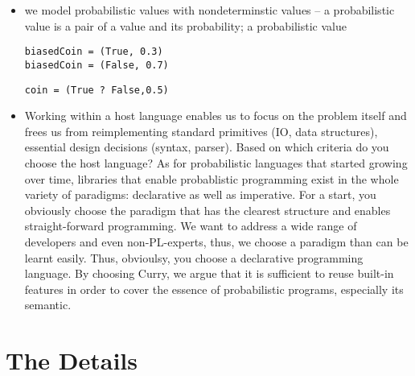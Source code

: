 \documentclass[
12pt, %
a4paper, %
oneside, %
]{llncs}
\begin{document}
\begin{itemize}
\item we model probabilistic values with nondeterminstic values -- a
  probabilistic value is a pair of a value and its probability; a
  probabilistic value %

\begin{verbatim}
biasedCoin = (True, 0.3)
biasedCoin = (False, 0.7)
\end{verbatim}

\begin{verbatim}
coin = (True ? False,0.5)
\end{verbatim}

\item Working within a host language enables us to focus on the
  problem itself and frees us from reimplementing standard primitives
  (IO, data structures), essential design decisions (syntax,
  parser). %
  Based on which criteria do you choose the host language? %
  As for probabilistic languages that started growing over time,
  libraries that enable probablistic programming exist in the whole
  variety of paradigms: declarative as well as imperative. %
  For a start, you obviously choose the paradigm that has the clearest
  structure and enables straight-forward programming. %
  We want to address a wide range of developers and even
  non-PL-experts, thus, we choose a paradigm than can be learnt
  easily. %
  Thus, obvioulsy, you choose a declarative programming language. %
  By choosing Curry, we argue that it is sufficient to reuse built-in
  features in order to cover the essence of probabilistic programs,
  especially its semantic. %
  
\end{itemize}

\section{The Details}
\end{document}
